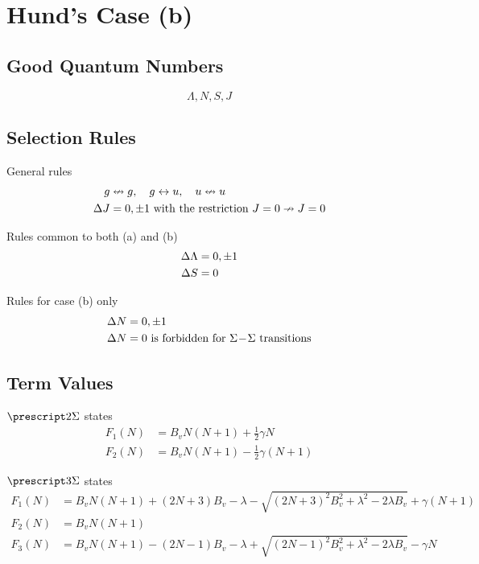 \section{Hund's Case (b)}
\label{s:hunds_case_b}

\subsection{Good Quantum Numbers}

\begin{equation*}
    \Lambda, N, S, J
\end{equation*}

\subsection{Selection Rules}

General rules
\begin{align*}
    g        & \nleftrightarrow g, \quad g \leftrightarrow u, \quad u \nleftrightarrow u \\
    \adif{J} & = 0, \pm 1 \text{ with the restriction } J = 0 \nrightarrow J = 0
\end{align*}

Rules common to both (a) and (b)
\begin{align*}
    \adif{\Lambda} & = 0, \pm 1 \\
    \adif{S}       & = 0
\end{align*}

Rules for case (b) only
\begin{align*}
    \adif{N} & = 0, \pm 1                                                          \\
    \adif{N} & = 0 \text{ is forbidden for } \Sigma\dash\Sigma \text{ transitions}
\end{align*}

\subsection{Term Values}

$\state{2}{\Sigma}$ states
\begin{align*}
    F_1(N) & = B_vN(N + 1) + \tfrac{1}{2}\gamma N      \\
    F_2(N) & = B_vN(N + 1) - \tfrac{1}{2}\gamma(N + 1)
\end{align*}

$\state{3}{\Sigma}$ states
\begin{align*}
    F_1(N) & = B_vN(N + 1) + (2N + 3)B_v - \lambda - \sqrt{(2N + 3)^2B_v^2 + \lambda^2 - 2\lambda B_v} + \gamma(N + 1) \\
    F_2(N) & = B_vN(N + 1)                                                                                                         \\
    F_3(N) & = B_vN(N + 1) - (2N - 1)B_v - \lambda + \sqrt{(2N - 1)^2B_v^2 + \lambda^2 - 2\lambda B_v} - \gamma N
\end{align*}
